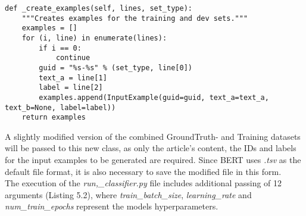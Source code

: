 \documentclass[a4paper, 11pt,titlepage,oneside,openany]{book}
\begin{document}
\newpage
\begin{lstlisting}[caption=Create\_examples in BERT]
def _create_examples(self, lines, set_type):
    """Creates examples for the training and dev sets."""
    examples = []
    for (i, line) in enumerate(lines):
        if i == 0:
            continue
        guid = "%s-%s" % (set_type, line[0])
        text_a = line[1]
        label = line[2]
        examples.append(InputExample(guid=guid, text_a=text_a, text_b=None, label=label))
    return examples
\end{lstlisting}
\indent A slightly modified version of the combined GroundTruth- and Training datasets will be passed to this new class, as only the article's content, the IDs and labels for the input examples to be generated are required. Since BERT uses \textit{.tsv} as the default file format, it is also necessary to save the modified file in this form. \\
\noindent The execution of the \textit{run,\_classifier.py} file includes additional passing of 12 arguments (Listing 5.2), where \textit{train\_batch\_size}, \textit{learning\_rate} and \textit{num\_train\_epochs} represent the models hyperparameters. 
\end{document}
